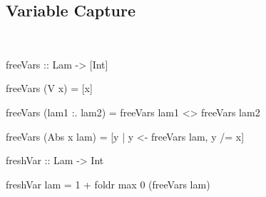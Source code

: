\documentclass{beamer}
\begin{document}
\subsection{Variable Capture}
\begin{frame}{\insertsectionhead\ \textemdash\
    \insertsubsectionhead}
\begin{code}
freeVars :: Lam -> [Int]

freeVars (V x) = [x]

freeVars (lam1 :. lam2) =
  freeVars lam1 <> freeVars lam2

freeVars (Abs x lam) =
  [y | y <- freeVars lam, y /= x]
\end{code}

  \framebreak

\begin{code}
freshVar :: Lam -> Int

freshVar lam = 1 + foldr max 0 (freeVars lam)
\end{code}
\end{frame}
\end{document}
